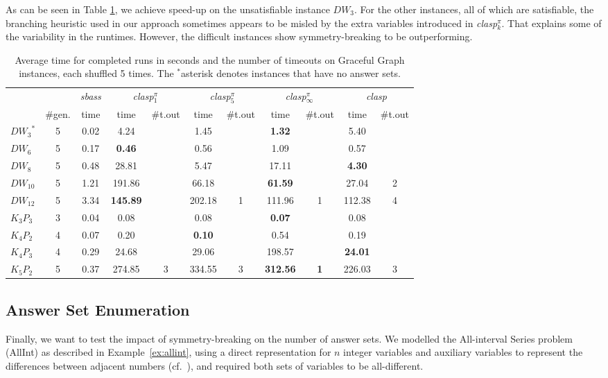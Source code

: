 \documentclass[envcountsame]{llncs}
\newcommand{\systemname}[1]{\emph{#1}}
\begin{document}
As can be seen in Table \ref{tab:graceful}, we achieve speed-up on the unsatisfiable instance $DW_3$. For the other instances, all of which are satisfiable, the branching heuristic used in our approach sometimes appears to be misled by the extra variables introduced in \systemname{clasp}$_k^\pi$. That explains some of the variability in the runtimes. However, the difficult instances show symmetry-breaking to be outperforming.
\begin{table}
\caption{Average time for completed runs in seconds and the number of timeouts on Graceful Graph instances, each shuffled 5 times. The $^\ast$asterisk denotes instances that have no answer sets.\label{tab:graceful}}
\centering
\begin{tabular}{lcccccccccc}
\hline\noalign{\smallskip}
 & & \systemname{sbass} & \multicolumn{2}{c}{\systemname{clasp}$_1^\pi$} & \multicolumn{2}{c}{\systemname{clasp}$_5^\pi$} & \multicolumn{2}{c}{\systemname{clasp}$_\infty^\pi$} & \multicolumn{2}{c}{\systemname{clasp}}\\ 
   & \#gen. & time & time & \#t.out & time & \#t.out & time & \#t.out & time & \#t.out\\
\noalign{\smallskip}
\hline
\noalign{\smallskip}
${DW_3}^\ast$   & 5 & 0.02 & 4.24 & & 1.45 & & \textbf{1.32} & & 5.40 &\\
$DW_6$   & 5 & 0.17 & \textbf{0.46} & & 0.56 & & 1.09 & & 0.57 &\\
$DW_8$   & 5 & 0.48 &28.81 & & 5.47 & &17.11 & & \textbf{4.30} &\\
$DW_{10}$& 5 & 1.21 &191.86& &66.18 & &\textbf{61.59} & &27.04 &2\\
$DW_{12}$& 5 & 3.34 & \textbf{145.89}& &202.18&1&111.96 &1&112.38 &4\\
$K_3P_3$ & 3 & 0.04 & 0.08 & & 0.08 & & \textbf{0.07} & & 0.08 &\\
$K_4P_2$ & 4 & 0.07 & 0.20 & & \textbf{0.10} & & 0.54 & & 0.19 &\\
$K_4P_3$ & 4 & 0.29 &24.68 & &29.06 & &198.57& &\textbf{24.01}& \\
$K_5P_2$ & 5 & 0.37 &274.85&3&334.55&3&\textbf{312.56}&\textbf{1}&226.03&3\\
\hline
\end{tabular}
\end{table}

\subsection{Answer Set Enumeration \label{sec:enum}}
Finally, we want to test the impact of symmetry-breaking on the number of answer sets. We modelled the All-interval Series problem (AllInt) as described in Example~\ref{ex:allint}, using a direct representation for $n$ integer variables and auxiliary variables to represent the differences between adjacent numbers (cf.~\cite{drwa10a}), and required both sets of variables to be all-different.
\end{document}
